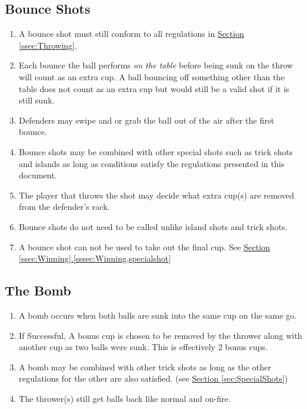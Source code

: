 	\subsection{Bounce Shots}\label{ssec:BounceShots}
		\begin{enumerate}[label=(\roman*)]
            \item \label{sssec:BounceShots,rules} A bounce shot must still conform to all regulations in \hyperref[ssec:Throwing]{Section \ref{ssec:Throwing}}.
            \item \label{sssec:BounceShots,multibounce} Each bounce the ball performs \textit{on the table} before being sunk on the throw will count as an extra cup.
                A ball bouncing off something other than the table does not count as an extra cup but would still be a valid shot if it is still sunk.
            \item \label{sssec:BounceShots,swipegrab} Defenders may swipe and or grab the ball out of the air after the first bounce.
            \item \label{sssec:BounceShots,combo} Bounce shots may be combined with other special shots such as trick shots and islands as long as conditions satisfy the regulations presented in this document.
            \item \label{sssec:BounceShots,removedcups} The player that throws the shot may decide what extra cup(s) are removed from the defender's rack.
            \item \label{sssec:BounceShots,calling} Bounce shots do not need to be called unlike island shots and trick shots.
            \item \label{sssec:BounceShots,winning} A bounce shot can not be used to take out the final cup.
                See \hyperref[sssec:Winning,specialshot]{Section \ref{ssec:Winning}.\ref{sssec:Winning,specialshot}}
    \end{enumerate}
	\subsection{The Bomb}\label{ssec:Bomb}
        \begin{enumerate}[label=(\roman*)]
            \item \label{sssec:Bomb,condition} A bomb occurs when both balls are sunk into the same cup on the same go. 
            \item \label{sssec:Bomb,success} If Successful, A bonus cup is chosen to be removed by the thrower along with another cup as two balls were sunk.
                This is effectively 2 bonus cups.
            \item \label{sssec:Bomb,combo} A bomb may be combined with other trick shots as long as the other regulations for the other are also satisfied.
                (see \hyperref[sec:SpecialShots]{Section \ref{sec:SpecialShots}})
            \item \label{sssec:Bomb,ballback} The thrower(s) still get balls back like normal and on-fire.
        \end{enumerate}
